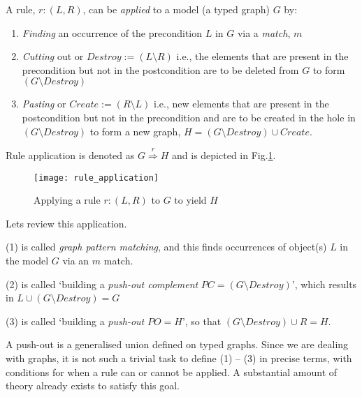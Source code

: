 A rule, $r: (L,R)$, can be \emph{applied} to a model (a typed graph) $G$ by:
\begin{enumerate}
  \item \emph{Finding} an occurrence of the precondition $L$ in $G$ via a \emph{match}, $m$
  
  \item \emph{Cutting} out or $Destroy := (L\setminus R)$ i.e., the elements that are present in the precondition but not in the postcondition are to be deleted
  from $G$ to form  $(G\setminus Destroy)$
  
  \item \emph{Pasting} or $Create := (R\setminus L)$ i.e., new elements that are present in the postcondition but not in the precondition and are to be created
  in the hole in $(G\setminus Destroy)$ to form a new graph, $H = (G\setminus Destroy) \cup Create$.
\end{enumerate}

Rule application is denoted as $G \stackrel{r}{\Rightarrow} H$ and is depicted in Fig.\ref{fig:rule_application}. 

\vspace{0.5cm}

\begin{figure}[htp]
\begin{center}
  \texttt{[image: rule\_application]}
  \caption[]{Applying a rule $r: (L,R)$ to $G$ to yield $H$} 
  \label{fig:rule_application}
\end{center}
\end{figure}

\vspace{0.5cm}

Lets review this application. 

(1) is called \emph{graph pattern matching}, and this finds occurrences of object(s) $L$ in the model $G$ via an $m$ match.

(2) is called `building a \emph{push-out complement} $PC = (G\setminus Destroy)$', which results in $L\cup(G\setminus Destroy) = G$

(3) is called `building a \emph{push-out} $PO = H$', so that $(G\setminus Destroy) \cup R = H$.

A push-out is a generalised union defined on typed graphs. Since we are dealing with graphs, it is not such a trivial task to define (1) -- (3) in precise
terms, with conditions for when a rule can or cannot be applied. A substantial amount of theory already exists to satisfy this goal.

